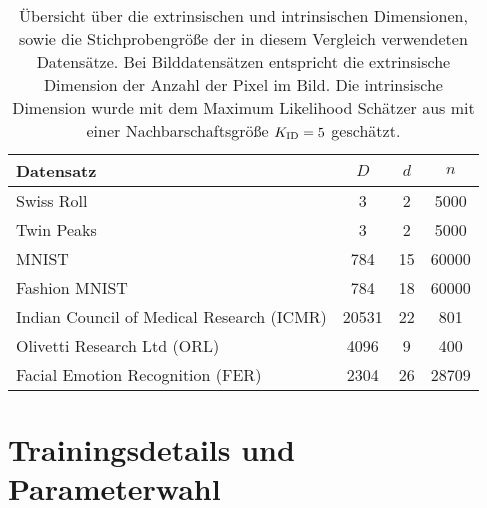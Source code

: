 \begin{table}[]
	\centering
	\begin{tabular}{@{}lS[table-format=5.0]S[table-format=2.0]S[table-format=5.0]@{}}
		\toprule
		Datensatz                                 & {$D$} & {$d$} & {$n$} \\ \midrule
		Swiss Roll                                & 3     & 2     & 5000  \\
		Twin Peaks                                & 3     & 2     & 5000  \\
		MNIST                                     & 784   & 15    & 60000 \\
		Fashion MNIST                             & 784   & 18    & 60000 \\
		Indian Council of Medical Research (ICMR) & 20531 & 22    & 801   \\
		Olivetti Research Ltd (ORL)               & 4096  & 9     & 400   \\
		Facial Emotion Recognition (FER)          & 2304  & 26    & 28709 \\
		\bottomrule
	\end{tabular}
	\caption[Übersicht über die extrinsischen und intrinsischen Dimensionen, sowie die Stichprobengrößen der in diesem Vergleich verwendeten Datensätze]{Übersicht über die extrinsischen und intrinsischen Dimensionen, sowie die Stichprobengröße der in diesem Vergleich verwendeten Datensätze. Bei Bilddatensätzen entspricht die extrinsische Dimension der Anzahl der Pixel im Bild. Die intrinsische Dimension wurde mit dem Maximum Likelihood Schätzer aus  mit einer Nachbarschaftsgröße $K_{\text{ID}} = 5$ geschätzt.}
	\label{tab:uebersicht-datensaetze}
\end{table}

\section{Trainingsdetails und Parameterwahl}
\label{ch:Vergleich:sec:ParameterwahlTrainingsdetails}

